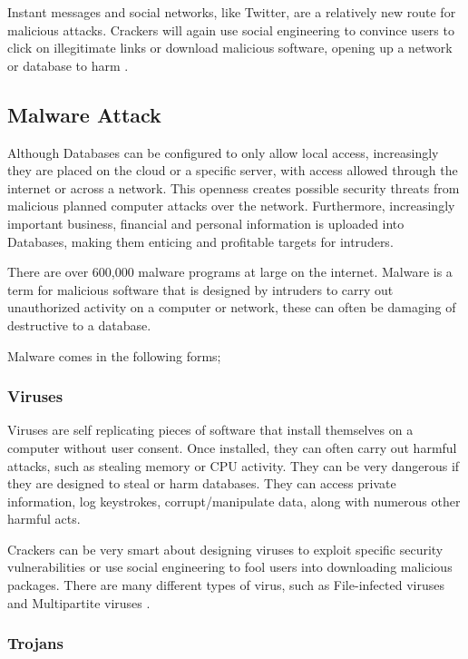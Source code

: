 \documentclass[11pt]{article}
\begin{document}
Instant messages and social networks, like Twitter, are a relatively new route for malicious attacks.  Crackers will again use social engineering to convince users to click on illegitimate links or download malicious software, opening up a network or database to harm \cite{Bas}.

\subsection{Malware Attack}

Although Databases can be configured to only allow local access, increasingly they are placed on the cloud or a specific server, with access allowed through the internet or across a network.  This openness creates possible security threats from malicious planned computer attacks over the network.  Furthermore, increasingly important business, financial and personal information is uploaded into Databases, making them enticing and profitable targets for intruders.

There are over 600,000 malware programs at large on the internet.  Malware is a term for malicious software that is designed by intruders to carry out unauthorized activity on a computer or network, these can often be damaging of destructive to a database.

Malware comes in the following forms;

\subsubsection{Viruses}
Viruses are self replicating pieces of software that install themselves on a computer without user consent.  Once installed, they can often carry out harmful attacks, such as stealing memory or CPU activity. They can be very dangerous if they are designed to steal or harm databases.  They can access private information, log keystrokes, corrupt/manipulate data, along with numerous other harmful acts.

Crackers can be very smart about designing viruses to exploit specific security vulnerabilities or use social engineering to fool users into downloading malicious packages.  There are many different types of virus, such as File-infected viruses and Multipartite viruses \cite{Bas}.

\subsubsection{Trojans}
\end{document}
